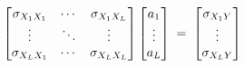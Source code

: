 \documentclass[preview]{standalone}
\begin{document}
\begin{align*}
\special{dvisvgm:raw <g id='unique000'>}\begin{bmatrix}\sigma_{X_1X_1} & \cdots & \sigma_{X_1X_L}\\\vdots & \ddots & \vdots\\\sigma_{X_LX_1} & \cdots & \sigma_{X_LX_L}\end{bmatrix}\begin{bmatrix} a_1\\ \vdots\\ a_L\end{bmatrix}\;=\;\begin{bmatrix}\sigma_{X_1Y}\\ \vdots\\ \sigma_{X_LY}\end{bmatrix}\special{dvisvgm:raw </g>}
\end{align*}
\end{document}
